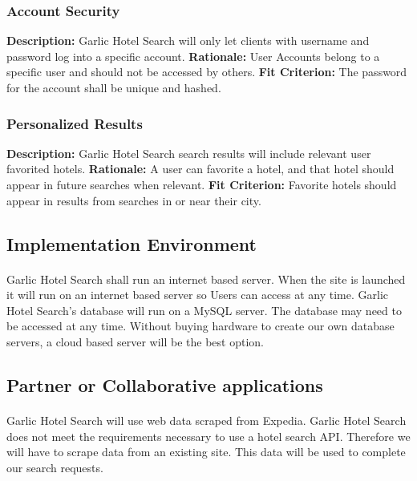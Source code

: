 \documentclass[]{article}
\begin{document}
\subsubsection{Account Security}
\textbf{Description:} Garlic Hotel Search will only let clients with username and password log into a specific account.\newline
\textbf{Rationale:} User Accounts belong to a specific user and should not be accessed by others.\newline
\textbf{Fit Criterion:} The password for the account shall be unique and hashed.

\subsubsection{Personalized Results}
\textbf{Description:} Garlic Hotel Search search results will include relevant user favorited hotels.\newline
\textbf{Rationale:} A user can favorite a hotel, and that hotel should appear in future searches when relevant.\newline
\textbf{Fit Criterion:} Favorite hotels should appear in results from searches in or near their city.

\subsection{Implementation Environment}
\paragraph{}
Garlic Hotel Search shall run an internet based server. When the site is launched it will run on an internet based server so Users can access at any time. Garlic Hotel Search’s database will run on a MySQL server. The database may need to be accessed at any time. Without buying hardware to create our own database servers, a cloud based server will be the best option.

\subsection{Partner or Collaborative applications}
\paragraph{}
Garlic Hotel Search will use web data scraped from Expedia. Garlic Hotel Search does not meet the requirements necessary to use a hotel search API. Therefore we will have to scrape data from an existing site. This data will be used to complete our search requests.
\end{document}
